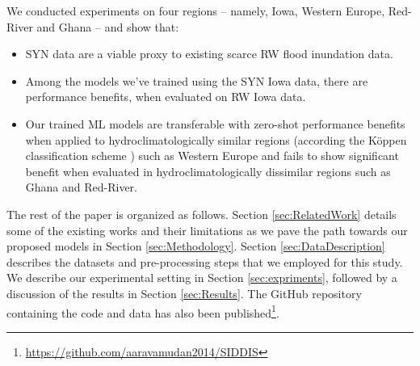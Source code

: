 We conducted experiments on four regions -- namely, Iowa, Western Europe, Red-River and Ghana -- and show that:

\begin{itemize}
    \item \ac{SYN} data are a viable proxy to existing scarce \ac{RW} flood inundation data.
    \item Among the models we've trained using the \ac{SYN} Iowa data, there are performance benefits, when evaluated on \ac{RW} Iowa data.
    \item Our trained ML models are transferable with zero-shot performance benefits when applied to hydroclimatologically similar regions (according the K\"{o}ppen classification scheme \cite{Chen2013GeoMorphologicalSimilarity}) such as Western Europe and fails to show significant benefit when evaluated in hydroclimatologically dissimilar regions such as Ghana and Red-River. 
\end{itemize}

The rest of the paper is organized as follows. Section \ref{sec:RelatedWork} details some of the existing works and their limitations as we pave the path towards our proposed models in Section \ref{sec:Methodology}. Section \ref{sec:DataDescription} describes the datasets and pre-processing steps that we employed for this study. We describe our experimental setting in Section \ref{sec:expriments}, followed by a discussion of the results in Section \ref{sec:Results}. The GitHub repository containing the code and data has also been published\footnote{\url{https://github.com/aaravamudan2014/SIDDIS}}. 



